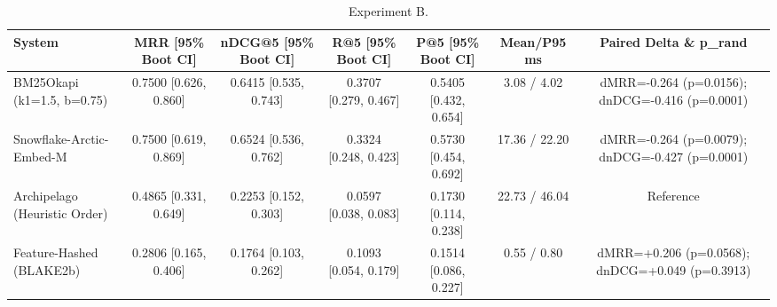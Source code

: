 \begin{table}[t]
\centering
\caption{Experiment B.}
\label{tab:t3_retrieval}
\small
\begin{tabular}{@{}lcccccc@{}}
\toprule
\textbf{System} & \textbf{MRR [95\% Boot CI]} & \textbf{nDCG@5 [95\% Boot CI]} & \textbf{R@5 [95\% Boot CI]} & \textbf{P@5 [95\% Boot CI]} & \textbf{Mean/P95 ms} & \textbf{Paired Delta \& p\_rand} \\
\midrule
BM25Okapi (k1=1.5, b=0.75) & 0.7500 [0.626, 0.860] & 0.6415 [0.535, 0.743] & 0.3707 [0.279, 0.467] & 0.5405 [0.432, 0.654] & 3.08 / 4.02 & dMRR=-0.264 (p=0.0156); dnDCG=-0.416 (p=0.0001) \\
Snowflake-Arctic-Embed-M & 0.7500 [0.619, 0.869] & 0.6524 [0.536, 0.762] & 0.3324 [0.248, 0.423] & 0.5730 [0.454, 0.692] & 17.36 / 22.20 & dMRR=-0.264 (p=0.0079); dnDCG=-0.427 (p=0.0001) \\
Archipelago (Heuristic Order) & 0.4865 [0.331, 0.649] & 0.2253 [0.152, 0.303] & 0.0597 [0.038, 0.083] & 0.1730 [0.114, 0.238] & 22.73 / 46.04 & Reference \\
Feature-Hashed (BLAKE2b) & 0.2806 [0.165, 0.406] & 0.1764 [0.103, 0.262] & 0.1093 [0.054, 0.179] & 0.1514 [0.086, 0.227] & 0.55 / 0.80 & dMRR=+0.206 (p=0.0568); dnDCG=+0.049 (p=0.3913) \\
\bottomrule
\end{tabular}
\end{table}
